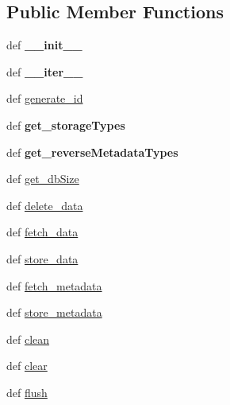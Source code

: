 \subsection*{Public Member Functions}
\begin{DoxyCompactItemize}
\item 
\hypertarget{classcheshire3_1_1base_store_1_1_directory_store_a26c745d493d399631d9b8f24d9ed5360}{def {\bfseries \-\_\-\-\_\-init\-\_\-\-\_\-}}\label{classcheshire3_1_1base_store_1_1_directory_store_a26c745d493d399631d9b8f24d9ed5360}

\item 
\hypertarget{classcheshire3_1_1base_store_1_1_directory_store_a19d947ae46120038de8f3a533ed0ef4e}{def {\bfseries \-\_\-\-\_\-iter\-\_\-\-\_\-}}\label{classcheshire3_1_1base_store_1_1_directory_store_a19d947ae46120038de8f3a533ed0ef4e}

\item 
def \hyperlink{classcheshire3_1_1base_store_1_1_directory_store_aeaca13697dd55efafee99e90b5de58d9}{generate\-\_\-id}
\item 
\hypertarget{classcheshire3_1_1base_store_1_1_directory_store_a59fc403bf2c42e4659f96d1fa19a3235}{def {\bfseries get\-\_\-storage\-Types}}\label{classcheshire3_1_1base_store_1_1_directory_store_a59fc403bf2c42e4659f96d1fa19a3235}

\item 
\hypertarget{classcheshire3_1_1base_store_1_1_directory_store_a36f9ac16715037baddcab1b3af9bdd79}{def {\bfseries get\-\_\-reverse\-Metadata\-Types}}\label{classcheshire3_1_1base_store_1_1_directory_store_a36f9ac16715037baddcab1b3af9bdd79}

\item 
def \hyperlink{classcheshire3_1_1base_store_1_1_directory_store_a739bfdade23677f5017e1055ceab19ff}{get\-\_\-db\-Size}
\item 
def \hyperlink{classcheshire3_1_1base_store_1_1_directory_store_ab8021265d36be63cd760e6677bde2877}{delete\-\_\-data}
\item 
def \hyperlink{classcheshire3_1_1base_store_1_1_directory_store_aa6cdba97d37eea50db2d58a686336f18}{fetch\-\_\-data}
\item 
def \hyperlink{classcheshire3_1_1base_store_1_1_directory_store_af87471f0740e2de66f6256352f72e556}{store\-\_\-data}
\item 
def \hyperlink{classcheshire3_1_1base_store_1_1_directory_store_a519edf74d4480a9a439cbf4c4786f1af}{fetch\-\_\-metadata}
\item 
def \hyperlink{classcheshire3_1_1base_store_1_1_directory_store_acaec3f63e9700ae23994002805802266}{store\-\_\-metadata}
\item 
def \hyperlink{classcheshire3_1_1base_store_1_1_directory_store_a7af7135a724759a7ef3bc2918ecd6292}{clean}
\item 
def \hyperlink{classcheshire3_1_1base_store_1_1_directory_store_a7b1ecda957cca43691ee6a7f2ba002ed}{clear}
\item 
def \hyperlink{classcheshire3_1_1base_store_1_1_directory_store_ab5201c282170b8cdc4e027543ea708bd}{flush}
\end{DoxyCompactItemize}
